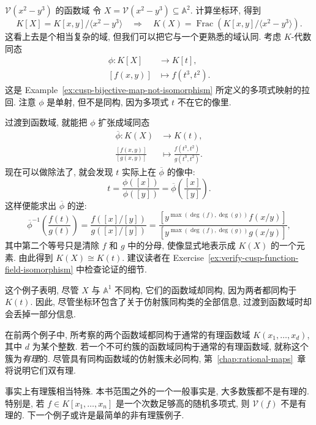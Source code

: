 \begin{Example}{$\mathcal{V}(x^{2}-y^{3})$ 的函数域}\leavevmode\label{ex:function-field-of-cusp}
令 $X=\mathcal{V}(x^{2}-y^{3})\subseteq\mathbb{A}^{2}$. 计算坐标环, 得到
\[
  K[X]=K[x,y]/\langle x^{2}-y^{3}\rangle
  \quad\Longrightarrow\quad
  K(X)=\operatorname{Frac}(K[x,y]/\langle x^{2}-y^{3}\rangle).
\]
这看上去是个相当复杂的域, 但我们可以把它与一个更熟悉的域认同. 考虑 $K$-代数同态
\[
  \begin{aligned}
    \phi:K[X]&\to K[t],\\
    [f(x,y)]&\mapsto f(t^{3},t^{2}).
  \end{aligned}
\]
这是 Example~\ref{ex:cusp-bijective-map-not-isomorphism} 所定义的多项式映射的拉回. 注意 $\phi$ 是单射, 但不是同构, 因为多项式 $t$ 不在它的像里.

过渡到函数域, 就能把 $\phi$ 扩张成域同态
\[
  \begin{aligned}
    \overline{\phi}:K(X)&\to K(t),\\
    \frac{[f(x,y)]}{[g(x,y)]}&\mapsto\frac{f(t^{3},t^{2})}{g(t^{3},t^{2})}.
  \end{aligned}
\]
现在可以做除法了, 就会发现 $t$ 实际上在 $\overline{\phi}$ 的像中:
\[
  t=\frac{\phi([x])}{\phi([y])}
    =\overline{\phi}\left(\frac{[x]}{[y]}\right).
\]
这样便能求出 $\overline{\phi}$ 的逆:
\[
  \overline{\phi}^{-1}\left(\frac{f(t)}{g(t)}\right)
    =\frac{f([x]/[y])}{g([x]/[y])}
    =\frac{[y^{\max(\deg(f),\deg(g))}f(x/y)]}
          {[y^{\max(\deg(f),\deg(g))}g(x/y)]},
\]
其中第二个等号只是清除 $f$ 和 $g$ 中的分母, 使像显式地表示成 $K(X)$ 的一个元素. 由此得到 $K(X)\cong K(t)$. 建议读者在 Exercise~\ref{ex:verify-cusp-function-field-isomorphism} 中检查论证的细节.

这个例子表明, 尽管 $X$ 与 $\mathbb{A}^{1}$ 不同构, 它们的函数域却同构, 因为两者都同构于 $K(t)$. 因此, 尽管坐标环包含了关于仿射簇同构类的全部信息, 过渡到函数域时却会丢掉一部分信息.
\end{Example}

\begin{BookFlowNote}[l]{%
在前两个例子中, 所考察的两个函数域都同构于通常的有理函数域 $K(x_{1},\ldots,x_{d})$, 其中 $d$ 为某个整数. 若一个不可约簇的函数域同构于通常的有理函数域, 就称这个簇为\emph{有理}的.
}
\noindent 尽管具有同构函数域的仿射簇未必同构, 第~\ref{chap:rational-maps}~章将说明它们\textquotedbl{}双有理\textquotedbl{}.

事实上有理簇相当特殊. 本书范围之外的一个一般事实是, \textquotedbl{}大多数\textquotedbl{}簇都不是有理的. 特别是, 若 $f\in K[x_{1},\ldots,x_{n}]$ 是一个次数足够高的\textquotedbl{}随机\textquotedbl{}多项式, 则 $\mathcal{V}(f)$ 不是有理的. 下一个例子或许是最简单的非有理簇例子.
\end{BookFlowNote}

